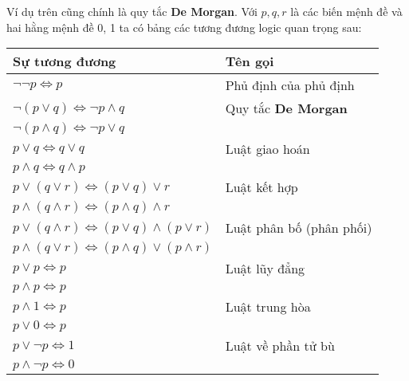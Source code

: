 \documentclass[11pt,fleqn]{book} %
\begin{document}
        Ví dụ trên cũng chính là quy tắc \textbf{De Morgan}. Với $p, q, r$ là các biến mệnh đề và hai hằng mệnh đề 0, 1 ta có bảng các tương đương logic quan trọng sau:
        
        \begin{table}[h!] 
            \centering
            \setlength{\tabcolsep}{18pt}
            \begin{tabular}{l |l}
                Sự tương đương & Tên gọi\\ \hline
                
                $\neg \neg p \Leftrightarrow p$ & Phủ định của phủ định\\ \hline
                
                $\neg (p \lor q) \Leftrightarrow \neg p \land q$ & Quy tắc \textbf{De Morgan}\\
                $\neg (p \land q) \Leftrightarrow \neg p \lor q$ & \\ \hline
                
                $p \lor q \Leftrightarrow q \lor q$ & Luật giao hoán\\
                $p \land q \Leftrightarrow q \land p$ & \\ \hline
                
                $p \lor (q \lor r) \Leftrightarrow (p \lor q) \lor r$ & Luật kết hợp\\ 
                $p \land (q \land r) \Leftrightarrow (p \land q) \land r$ & \\ \hline
                
                $p \lor (q \land r)  \Leftrightarrow (p \lor q) \land (p \lor r)$ & Luật phân bố (phân phối)\\
                $p \land (q \lor r) \Leftrightarrow (p \land q) \lor (p \land r)$ & \\ \hline
                
                $p \lor p \Leftrightarrow p$ & Luật lũy đẳng\\
                $p \land p \Leftrightarrow p$\\ \hline
                
                $p \land 1 \Leftrightarrow p$ & Luật trung hòa\\
                $p \lor 0 \Leftrightarrow p$ & \\ \hline
                
                $p \lor \neg p \Leftrightarrow 1$ & Luật về phần tử bù\\
                $p \land \neg p \Leftrightarrow 0$ & \\ \hline
                

\end{tabular}
\end{table}
\end{document}
